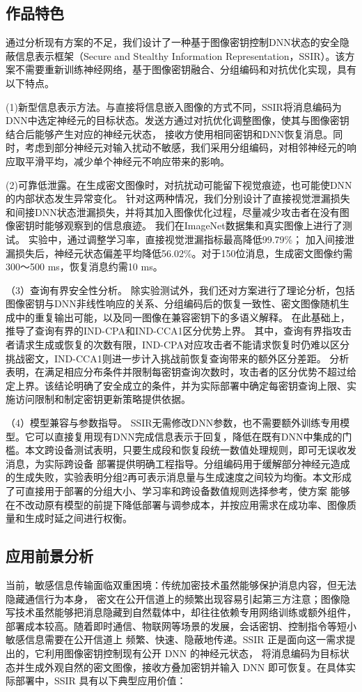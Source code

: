 \subsection{作品特色}
通过分析现有方案的不足，我们设计了一种基于图像密钥控制DNN状态的安全隐蔽信息表示框架（Secure and Stealthy Information Representation，SSIR）。该方案不需要重新训练神经网络，基于图像密钥融合、分组编码和对抗优化实现，具有以下特点。

(1)新型信息表示方法。与直接将信息嵌入图像的方式不同，SSIR将消息编码为DNN中选定神经元的目标状态。发送方通过对抗优化调整图像，使其与图像密钥结合后能够产生对应的神经元状态，
接收方使用相同密钥和DNN恢复消息。同时，考虑到部分神经元对输入扰动不敏感，我们采用分组编码，对相邻神经元的响应取平滑平均，减少单个神经元不响应带来的影响。

(2)可靠低泄露。在生成密文图像时，对抗扰动可能留下视觉痕迹，也可能使DNN的内部状态发生异常变化。
针对这两种情况，我们分别设计了直接视觉泄漏损失和间接DNN状态泄漏损失，并将其加入图像优化过程，尽量减少攻击者在没有图像密钥时能够观察到的信息痕迹。 我们在ImageNet数据集和真实图像上进行了测试。
实验中，通过调整学习率，直接视觉泄漏指标最高降低99.79\%；
加入间接泄漏损失后，神经元状态偏差平均降低56.02\%。对于150位消息，生成密文图像约需300～500 ms，恢复消息约需10 ms。

（3）查询有界安全性分析。 除实验测试外，我们还对方案进行了理论分析，包括图像密钥与DNN非线性响应的关系、分组编码后的恢复一致性、密文图像随机生成中的重复输出可能，以及同一图像在兼容密钥下的多语义解释。
在此基础上，推导了查询有界的IND-CPA和IND-CCA1区分优势上界。
其中，查询有界指攻击者请求生成或恢复的次数有限，IND-CPA对应攻击者不能请求恢复时仍难以区分挑战密文，IND-CCA1则进一步计入挑战前恢复查询带来的额外区分差距。
分析表明，在满足相应分布条件并限制每密钥查询次数时，攻击者的区分优势不超过给定上界。该结论明确了安全成立的条件，并为实际部署中确定每密钥查询上限、实施访问限制和制定密钥更新策略提供依据。

（4）模型兼容与参数指导。 SSIR无需修改DNN参数，也不需要额外训练专用模型。它可以直接复用现有DNN完成信息表示于回复，降低在既有DNN中集成的门槛。本文跨设备测试表明，只要生成段和恢复段统一数值处理规则，即可无误收发消息，为实际跨设备
部署提供明确工程指导。分组编码用于缓解部分神经元造成的生成失败，实验表明分组2再可表示消息量与生成速度之间较为均衡。本文形成了可直接用于部署的分组大小、学习率和跨设备数值规则选择参考，使方案
能够在不改动原有模型的前提下降低部署与调参成本，并按应用需求在成功率、图像质量和生成时延之间进行权衡。

\subsection{应用前景分析}
当前，敏感信息传输面临双重困境：传统加密技术虽然能够保护消息内容，但无法隐藏通信行为本身，
密文在公开信道上的频繁出现容易引起第三方注意；图像隐写技术虽然能够把消息隐藏到自然载体中，却往往依赖专用网络训练或额外组件，
部署成本较高。随着即时通信、物联网等场景的发展，会话密钥、控制指令等短小敏感信息需要在公开信道上
频繁、快速、隐蔽地传递。SSIR 正是面向这一需求提出的，它利用图像密钥控制现有公开 DNN 的神经元状态，
将消息编码为目标状态并生成外观自然的密文图像，接收方叠加密钥并输入 DNN 即可恢复。在具体实际部署中，SSIR 具有以下典型应用价值：


